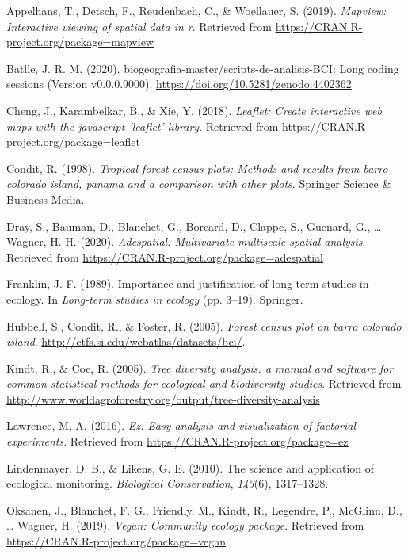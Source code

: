 \documentclass[11pt,]{article}
\begin{document}
\hypertarget{refs}{}
\hypertarget{ref-MapView}{}
Appelhans, T., Detsch, F., Reudenbach, C., \& Woellauer, S. (2019).
\emph{Mapview: Interactive viewing of spatial data in r}. Retrieved from
\url{https://CRAN.R-project.org/package=mapview}

\hypertarget{ref-jose_ramon_martinez_batlle_2020_4402362}{}
Batlle, J. R. M. (2020). biogeografia-master/scripts-de-analisis-BCI:
Long coding sessions (Version v0.0.0.9000).
\url{https://doi.org/10.5281/zenodo.4402362}

\hypertarget{ref-Leaflet}{}
Cheng, J., Karambelkar, B., \& Xie, Y. (2018). \emph{Leaflet: Create
interactive web maps with the javascript 'leaflet' library}. Retrieved
from \url{https://CRAN.R-project.org/package=leaflet}

\hypertarget{ref-condit1998tropical}{}
Condit, R. (1998). \emph{Tropical forest census plots: Methods and
results from barro colorado island, panama and a comparison with other
plots}. Springer Science \& Business Media.

\hypertarget{ref-adespatial}{}
Dray, S., Bauman, D., Blanchet, G., Borcard, D., Clappe, S., Guenard,
G., \ldots{} Wagner, H. H. (2020). \emph{Adespatial: Multivariate
multiscale spatial analysis}. Retrieved from
\url{https://CRAN.R-project.org/package=adespatial}

\hypertarget{ref-franklin1989importance}{}
Franklin, J. F. (1989). Importance and justification of long-term
studies in ecology. In \emph{Long-term studies in ecology} (pp. 3--19).
Springer.

\hypertarget{ref-Hubbell2005Barro}{}
Hubbell, S., Condit, R., \& Foster, R. (2005). \emph{Forest census plot
on barro colorado island}.
\url{http://ctfs.si.edu/webatlas/datasets/bci/}.

\hypertarget{ref-Biodiv}{}
Kindt, R., \& Coe, R. (2005). \emph{Tree diversity analysis. a manual
and software for common statistical methods for ecological and
biodiversity studies}. Retrieved from
\url{http://www.worldagroforestry.org/output/tree-diversity-analysis}

\hypertarget{ref-EZ}{}
Lawrence, M. A. (2016). \emph{Ez: Easy analysis and visualization of
factorial experiments}. Retrieved from
\url{https://CRAN.R-project.org/package=ez}

\hypertarget{ref-lindenmayer2010science}{}
Lindenmayer, D. B., \& Likens, G. E. (2010). The science and application
of ecological monitoring. \emph{Biological Conservation}, \emph{143}(6),
1317--1328.

\hypertarget{ref-VeganPack}{}
Oksanen, J., Blanchet, F. G., Friendly, M., Kindt, R., Legendre, P.,
McGlinn, D., \ldots{} Wagner, H. (2019). \emph{Vegan: Community ecology
package}. Retrieved from \url{https://CRAN.R-project.org/package=vegan}
\end{document}
